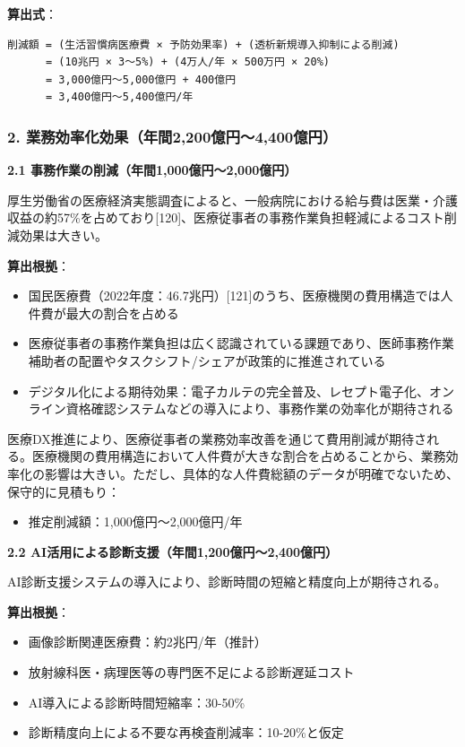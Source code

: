 \documentclass[
  a4paper,
  a4paper,
  11pt]{ltjsbook}
\providecommand{\tightlist}{%
  \setlength{\itemsep}{0pt}\setlength{\parskip}{0pt}}
\begin{document}
\textbf{算出式}：

\begin{verbatim}
削減額 = (生活習慣病医療費 × 予防効果率) + (透析新規導入抑制による削減)
      = (10兆円 × 3〜5%) + (4万人/年 × 500万円 × 20%)
      = 3,000億円〜5,000億円 + 400億円
      = 3,400億円〜5,400億円/年
\end{verbatim}

\subsubsection{2.
業務効率化効果（年間2,200億円〜4,400億円）}\label{ux696dux52d9ux52b9ux7387ux5316ux52b9ux679cux5e74ux95932200ux5104ux51864400ux5104ux5186}

\textbf{2.1 事務作業の削減（年間1,000億円〜2,000億円）}

厚生労働省の医療経済実態調査によると、一般病院における給与費は医業・介護収益の約57\%を占めており{[}120{]}、医療従事者の事務作業負担軽減によるコスト削減効果は大きい。

\textbf{算出根拠}：

\begin{itemize}
\tightlist
\item
  国民医療費（2022年度：46.7兆円）{[}121{]}のうち、医療機関の費用構造では人件費が最大の割合を占める
\item
  医療従事者の事務作業負担は広く認識されている課題であり、医師事務作業補助者の配置やタスクシフト/シェアが政策的に推進されている
\item
  デジタル化による期待効果：電子カルテの完全普及、レセプト電子化、オンライン資格確認システムなどの導入により、事務作業の効率化が期待される
\end{itemize}

医療DX推進により、医療従事者の業務効率改善を通じて費用削減が期待される。医療機関の費用構造において人件費が大きな割合を占めることから、業務効率化の影響は大きい。ただし、具体的な人件費総額のデータが明確でないため、保守的に見積もり：

\begin{itemize}
\tightlist
\item
  推定削減額：1,000億円〜2,000億円/年
\end{itemize}

\textbf{2.2 AI活用による診断支援（年間1,200億円〜2,400億円）}

AI診断支援システムの導入により、診断時間の短縮と精度向上が期待される。

\textbf{算出根拠}：

\begin{itemize}
\tightlist
\item
  画像診断関連医療費：約2兆円/年（推計）
\item
  放射線科医・病理医等の専門医不足による診断遅延コスト
\item
  AI導入による診断時間短縮率：30-50\%
\item
  診断精度向上による不要な再検査削減率：10-20\%と仮定
\end{itemize}
\end{document}
